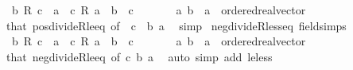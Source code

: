 \begin{isabellebody}
\ \ {\isachardoublequoteopen}b\ {\isacharslash}{\kern0pt}\isactrlsub R\ c\ {\isasymle}\ a\ {\isasymlongleftrightarrow}\ c\ {\isacharasterisk}{\kern0pt}\isactrlsub R\ a\ {\isasymle}\ b{\isachardoublequoteclose}\ \ {\isachardoublequoteopen}c\ {\isacharless}{\kern0pt}\ {}{\isachardoublequoteclose}\isanewline
\ \ \ \ \ a\ b\ {\isacharcolon}{\kern0pt}{\isacharcolon}{\kern0pt}\ {\isachardoublequoteopen}{\isacharprime}{\kern0pt}a\ {\isacharcolon}{\kern0pt}{\isacharcolon}{\kern0pt}\ ordered{\isacharunderscore}{\kern0pt}real{\isacharunderscore}{\kern0pt}vector{\isachardoublequoteclose}\isanewline
%
\isadelimproof
\ \ %
\endisadelimproof
%
\isatagproof
{}\isamarkupfalse%
\ that\ pos{\isacharunderscore}{\kern0pt}divideR{\isacharunderscore}{\kern0pt}le{\isacharunderscore}{\kern0pt}eq\ {\isacharbrackleft}{\kern0pt}of\ {\isachardoublequoteopen}{\isacharminus}{\kern0pt}\ c{\isachardoublequoteclose}\ {\isachardoublequoteopen}{\isacharminus}{\kern0pt}\ b{\isachardoublequoteclose}\ a{\isacharbrackright}{\kern0pt}\ \isamarkupfalse%
\ simp%
\endisatagproof
{\isafoldproof}%
%
\isadelimproof
\isanewline
%
\endisadelimproof
\isanewline
{}\isamarkupfalse%
\ neg{\isacharunderscore}{\kern0pt}divideR{\isacharunderscore}{\kern0pt}less{\isacharunderscore}{\kern0pt}eq\ {\isacharbrackleft}{\kern0pt}field{\isacharunderscore}{\kern0pt}simps{\isacharbrackright}{\kern0pt}{\isacharcolon}{\kern0pt}\isanewline
\ \ {\isachardoublequoteopen}b\ {\isacharslash}{\kern0pt}\isactrlsub R\ c\ {\isacharless}{\kern0pt}\ a\ {\isasymlongleftrightarrow}\ c\ {\isacharasterisk}{\kern0pt}\isactrlsub R\ a\ {\isacharless}{\kern0pt}\ b{\isachardoublequoteclose}\ \ {\isachardoublequoteopen}c\ {\isacharless}{\kern0pt}\ {}{\isachardoublequoteclose}\isanewline
\ \ \ \ \ a\ b\ {\isacharcolon}{\kern0pt}{\isacharcolon}{\kern0pt}\ {\isachardoublequoteopen}{\isacharprime}{\kern0pt}a\ {\isacharcolon}{\kern0pt}{\isacharcolon}{\kern0pt}\ ordered{\isacharunderscore}{\kern0pt}real{\isacharunderscore}{\kern0pt}vector{\isachardoublequoteclose}\isanewline
%
\isadelimproof
\ \ %
\endisadelimproof
%
\isatagproof
{}\isamarkupfalse%
\ that\ neg{\isacharunderscore}{\kern0pt}divideR{\isacharunderscore}{\kern0pt}le{\isacharunderscore}{\kern0pt}eq\ {\isacharbrackleft}{\kern0pt}of\ c\ b\ a{\isacharbrackright}{\kern0pt}\ \isamarkupfalse%
\ {\isacharparenleft}{\kern0pt}auto\ simp\ add{\isacharcolon}{\kern0pt}\ le{\isacharunderscore}{\kern0pt}less{\isacharparenright}{\kern0pt}%

\end{isabellebody}
